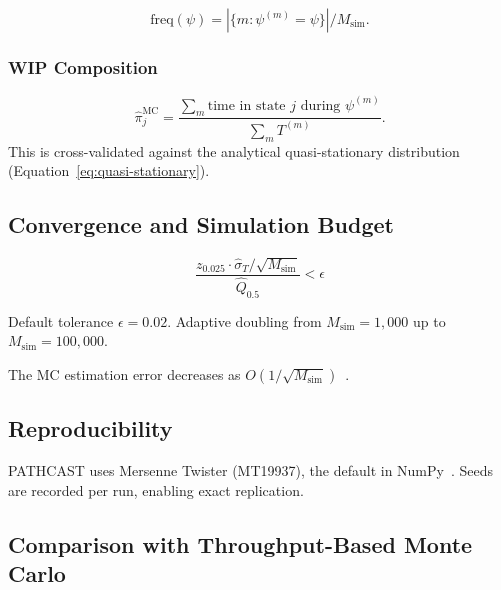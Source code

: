 \begin{equation}
\label{eq:path-freq}
\text{freq}(\psi) = |\{m : \psi^{(m)} = \psi\}| / M_{\text{sim}}.
\end{equation}

\subsubsection{WIP Composition}

\begin{equation}
\label{eq:wip-composition}
\hat{\pi}_j^{\text{MC}} = \frac{\sum_m \text{time in state } j \text{ during } \psi^{(m)}}
    {\sum_m T^{(m)}}.
\end{equation}
This is cross-validated against the analytical quasi-stationary
distribution (Equation~\ref{eq:quasi-stationary}).


\subsection{Convergence and Simulation Budget}
\label{sec:s4-convergence}

\begin{definition}
\label{def:convergence}
\begin{equation}
\label{eq:convergence-criterion}
\frac{z_{0.025} \cdot \hat{\sigma}_T / \sqrt{M_{\text{sim}}}}{\hat{Q}_{0.5}}
    < \epsilon
\end{equation}
\end{definition}

Default tolerance $\epsilon = 0.02$. Adaptive doubling from
$M_{\text{sim}} = 1{,}000$ up to $M_{\text{sim}} = 100{,}000$.

\begin{property}
\label{prop:convergence-rate}
The MC estimation error decreases as
$O(1/\sqrt{M_{\text{sim}}})$~\cite{robert2004monte}.
\end{property}


\subsection{Reproducibility}
\label{sec:s4-prng}

PATHCAST uses Mersenne Twister (MT19937), the default in
NumPy~\cite{numpy2020}. Seeds are recorded per run, enabling exact
replication.


\subsection{Comparison with Throughput-Based Monte Carlo}
\label{sec:s4-comparison}


